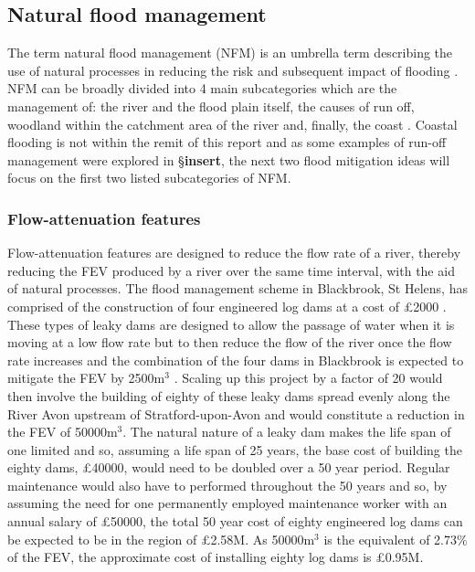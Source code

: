 \documentclass[11pt,a4paper]{article}
\begin{document}
\subsection{Natural flood management}
The term natural flood management (NFM) is an umbrella term describing the use of natural processes in reducing the risk and subsequent impact of flooding \cite{NFM}. NFM can be broadly divided into 4 main subcategories which are the management of: the river and the flood plain itself, the causes of run off, woodland within the catchment area of the river and, finally, the coast \cite{nfm}. Coastal flooding is not within the remit of this report and as some examples of run-off management were explored in \S \textbf{insert}, the next two flood mitigation ideas will focus on the first two listed subcategories of NFM.

\subsubsection{Flow-attenuation features}
Flow-attenuation features are designed to reduce the flow rate of a river, thereby reducing the FEV produced by a river over the same time interval, with the aid of natural processes. The flood management scheme in Blackbrook, St Helens, has comprised of the construction of four engineered log dams at a cost of \pounds2000 \cite{nfm}. These types of leaky dams are designed to allow the passage of water when it is moving at a low flow rate but to then reduce the flow of the river once the flow rate increases and the combination of the four dams in Blackbrook is expected to mitigate the FEV by 2500m$^3$ \cite{blackbrook}. Scaling up this project by a factor of 20 would then involve the building of eighty of these leaky dams spread evenly along the River Avon upstream of Stratford-upon-Avon and would constitute a reduction in the FEV of 50000m$^3$. The natural nature of a leaky dam makes the life span of one limited and so, assuming a life span of 25 years, the base cost of building the eighty dams, \pounds40000, would need to be doubled over a 50 year period. Regular maintenance would also have to performed throughout the 50 years and so, by assuming the need for one permanently employed maintenance worker with an annual salary of \pounds50000, the total 50 year cost of eighty engineered log dams can be expected to be in the region of \pounds2.58M. As 50000m$^3$ is the equivalent of 2.73\% of the FEV, the approximate cost of installing eighty log dams is \pounds0.95M.
\end{document}
